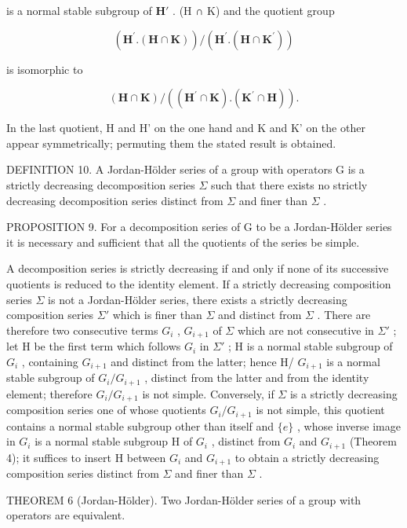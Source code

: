 is a normal stable subgroup of \(\mathbf{H}'\) . (H ∩ K) and the quotient group

\[
(\mathbf {H} ^ {\prime}. (\mathbf {H} \cap \mathbf {K})) / (\mathbf {H} ^ {\prime}. (\mathbf {H} \cap \mathbf {K} ^ {\prime}))
\]

is isomorphic to

\[
(\mathbf {H} \cap \mathbf {K}) / ((\mathbf {H} ^ {\prime} \cap \mathbf {K}). (\mathbf {K} ^ {\prime} \cap \mathbf {H})).
\]

In the last quotient, H and H' on the one hand and K and K' on the other appear symmetrically; permuting them the stated result is obtained.

DEFINITION 10. A Jordan-Hölder series of a group with operators G is a strictly decreasing decomposition series \(\Sigma\) such that there exists no strictly decreasing decomposition series distinct from \(\Sigma\) and finer than \(\Sigma\) .

PROPOSITION 9. For a decomposition series of G to be a Jordan-Hölder series it is necessary and sufficient that all the quotients of the series be simple.

A decomposition series is strictly decreasing if and only if none of its successive quotients is reduced to the identity element. If a strictly decreasing composition series \(\Sigma\) is not a Jordan-Hölder series, there exists a strictly decreasing composition series \(\Sigma'\) which is finer than \(\Sigma\) and distinct from \(\Sigma\) . There are therefore two consecutive terms \(G_i\) , \(G_{i+1}\) of \(\Sigma\) which are not consecutive in \(\Sigma'\) ; let H be the first term which follows \(G_i\) in \(\Sigma'\) ; H is a normal stable subgroup of \(G_i\) , containing \(G_{i+1}\) and distinct from the latter; hence H/ \(G_{i+1}\) is a normal stable subgroup of \(G_i/G_{i+1}\) , distinct from the latter and from the identity element; therefore \(G_i/G_{i+1}\) is not simple. Conversely, if \(\Sigma\) is a strictly decreasing composition series one of whose quotients \(G_i/G_{i+1}\) is not simple, this quotient contains a normal stable subgroup other than itself and \(\{e\}\) , whose inverse image in \(G_i\) is a normal stable subgroup H of \(G_i\) , distinct from \(G_i\) and \(G_{i+1}\) (Theorem 4); it suffices to insert H between \(G_i\) and \(G_{i+1}\) to obtain a strictly decreasing composition series distinct from \(\Sigma\) and finer than \(\Sigma\) .

THEOREM 6 (Jordan-Hölder). Two Jordan-Hölder series of a group with operators are equivalent.

